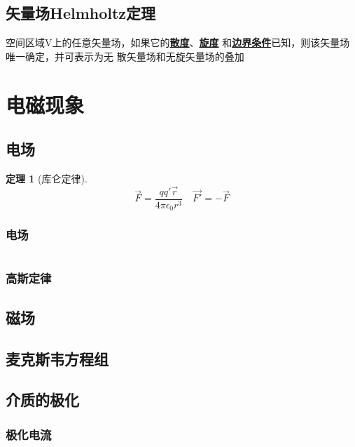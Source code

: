 \documentclass[twocolumn]{ctexart}
\newtheorem{theorem}{定理}[section]
\begin{document}
\subsection{矢量场Helmholtz定理}
空间区域V上的任意矢量场，如果它的\underline{\textbf{散度}}、\underline{\textbf{旋度}}
和\underline{\textbf{边界条件}}已知，则该矢量场唯一确定，并可表示为无
散矢量场和无旋矢量场的叠加
\section{电磁现象}
\subsection{电场}
\begin{theorem}[库仑定律]
  \begin{equation}
  \vec{F}=\frac{qq'\vec{r}}{4 \pi \epsilon_0 r^3} \quad   \vec{F'}=-\vec{F}\tag{2.1}
  \end{equation}
\end{theorem}
\subsubsection{电场}
\begin{equation}
\tag{2.2}
\end{equation}
\subsubsection{高斯定律}

\subsection{磁场}
\subsection{麦克斯韦方程组}
\subsection{介质的极化}
\subsubsection{极化电流}
\begin{align}
  \tag{3.1.a} \\

\end{align}
\end{document}
